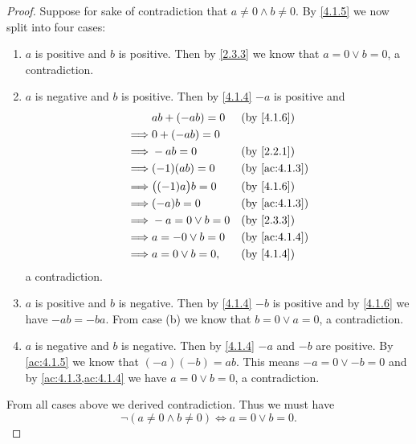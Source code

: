 \begin{proof}
  Suppose for sake of contradiction that \(a \neq 0 \land b \neq 0\).
  By \cref{4.1.5} we now split into four cases:
  \begin{enumerate}
    \item \(a\) is positive and \(b\) is positive.
          Then by \cref{2.3.3} we know that \(a = 0 \lor b = 0\), a contradiction.
    \item \(a\) is negative and \(b\) is positive.
          Then by \cref{4.1.4} \(-a\) is positive and
          \begin{align*}
                     & ab + (-ab) = 0       &  & \text{(by \cref{4.1.6})}    \\
            \implies & 0 + (-ab) = 0                                         \\
            \implies & -ab = 0              &  & \text{(by \cref{2.2.1})}    \\
            \implies & (-1)(ab) = 0         &  & \text{(by \cref{ac:4.1.3})} \\
            \implies & \big((-1)a\big)b = 0 &  & \text{(by \cref{4.1.6})}    \\
            \implies & (-a)b = 0            &  & \text{(by \cref{ac:4.1.3})} \\
            \implies & -a = 0 \lor b = 0    &  & \text{(by \cref{2.3.3})}    \\
            \implies & a = -0 \lor b = 0    &  & \text{(by \cref{ac:4.1.4})} \\
            \implies & a = 0 \lor b = 0,    &  & \text{(by \cref{4.1.4})}
          \end{align*}
          a contradiction.
    \item \(a\) is positive and \(b\) is negative.
          Then by \cref{4.1.4} \(-b\) is positive and by \cref{4.1.6} we have \(-ab = -ba\).
          From case (b) we know that \(b = 0 \lor a = 0\), a contradiction.
    \item \(a\) is negative and \(b\) is negative.
          Then by \cref{4.1.4} \(-a\) and \(-b\) are positive.
          By \cref{ac:4.1.5} we know that \((-a)(-b) = ab\).
          This means \(-a = 0 \lor -b = 0\) and by \cref{ac:4.1.3,ac:4.1.4} we have \(a = 0 \lor b = 0\), a contradiction.
  \end{enumerate}
  From all cases above we derived contradiction.
  Thus we must have
  \[
    \lnot(a \neq 0 \land b \neq 0) \iff a = 0 \lor b = 0.
  \]
\end{proof}

